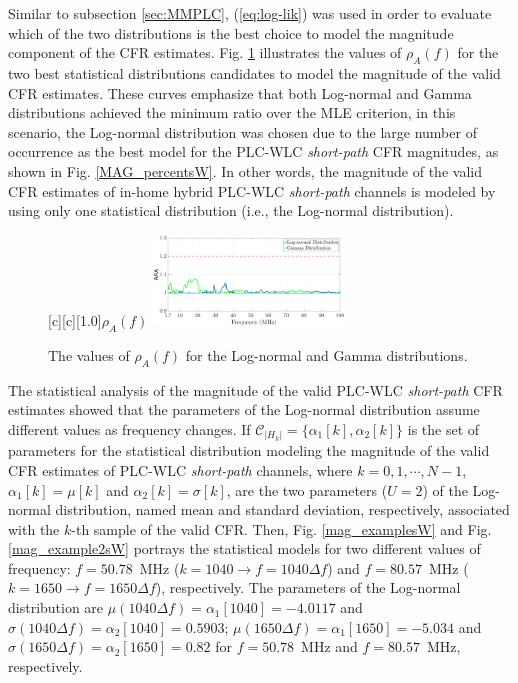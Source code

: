 \documentclass[journal]{IEEEtran}
\begin{document}
Similar to subsection \ref{sec:MMPLC}, (\ref{eq:log-lik}) was used in order to evaluate which of the two distributions is the best choice to model the magnitude component of the \ac{CFR} estimates. Fig. \ref{fig:Log_likesW} illustrates the values of  $\rho_{A}(f)$ for the two best statistical distributions candidates to model the magnitude of the valid \ac{CFR} estimates. These curves emphasize that both Log-normal and Gamma distributions achieved the minimum ratio over the \ac{MLE} criterion, in this scenario, the Log-normal distribution was chosen due to the large number of occurrence as the best model for the \ac{PLC}-\ac{WLC} \textit{short-path} \ac{CFR} magnitudes, as shown in Fig. \ref{MAG_percentsW}. In other words, the magnitude of the valid \ac{CFR} estimates of in-home hybrid \ac{PLC}-\ac{WLC} \textit{short-path} channels is modeled by using only one statistical distribution (i.e., the Log-normal distribution).

\begin{figure}[h!]
	\centering
	[c][1.0]{$\rho_{A} (f)$}
	\includegraphics[width=0.45\textwidth]{images/Log_Lognormal_GammasW.eps}
	\caption{The values of $\rho_{A} (f)$ for the Log-normal and Gamma distributions.}
	\label{fig:Log_likesW}
\end{figure}


The statistical analysis of the magnitude of the valid \ac{PLC}-\ac{WLC} \textit{short-path} \ac{CFR} estimates showed that the parameters of the Log-normal distribution assume different values as frequency changes. If $\mathcal{C}_{|H_k|} = \{\alpha_1[k],\alpha_2[k]\}$ is the set of parameters for the statistical distribution modeling the magnitude of the valid \ac{CFR} estimates of \ac{PLC}-\ac{WLC} \textit{short-path} channels, where $k=0,1,\cdots,N-1$,  $\alpha_1[k] = \mu[k]$ and $\alpha_2[k] = \sigma[k]$, are the two parameters ($U=2$) of the Log-normal distribution, named mean and standard deviation, respectively, associated with the $k$-th sample of the valid \ac{CFR}. Then, Fig. \ref{mag_examplesW} and Fig. \ref{mag_example2sW} portrays the statistical models for two different values of frequency: $f=50.78$~MHz ($k=1040 \rightarrow f = 1040\Delta f$) and $f=80.57$~MHz ($k=1650 \rightarrow f = 1650\Delta f$), respectively. The parameters of the Log-normal distribution are  $\mu(1040 \Delta f) = \alpha_1[1040]=-4.0117$ and $\sigma( 1040 \Delta f) = \alpha_2[1040] = 0.5903$; $\mu(1650 \Delta f) = \alpha_1[1650] = -5.034$ and $\sigma( 1650 \Delta f) = \alpha_2[1650]=0.82$ for $f=50.78$~MHz and $f=80.57$~MHz, respectively.
\end{document}
